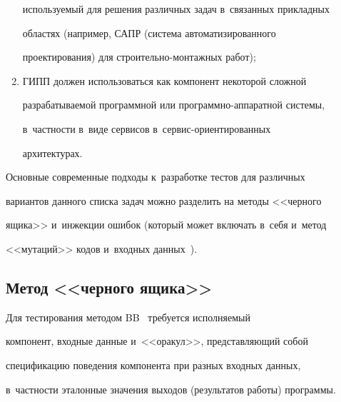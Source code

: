 \begin{multicols}{2}
\begin{enumerate}[(1)]
используемый для решения различных задач в~связанных прикладных 


областях (например, САПР (система автоматизированного


проектирования) для стро\-и\-тель\-но-мон\-таж\-ных работ);


    \item ГИПП должен использоваться как компонент некоторой сложной 


разрабатываемой программной или программно-аппаратной системы, 


в~частности в~виде сервисов в~сер\-вис-ори\-ен\-ти\-ро\-ван\-ных 


архитектурах.


    \end{enumerate}


    


    Основные современные подходы к~разработке тестов для различных 


вариантов данного списка задач можно разделить на методы <<черного 


ящика>>  и~инжекции ошибок (который может включать в~себя и~метод 


<<мутаций>> кодов и~входных данных~\cite{8-bf}).





\vspace*{-3pt}


    


    \subsection{Метод <<черного ящика>>}


    


    \vspace*{-1pt}


    


    Для тестирования методом BB~\cite{9-bf} требуется исполняемый 


компонент, входные данные и~<<оракул>>, представляющий собой 


спецификацию поведения компонента при разных входных данных, 


в~частности эталонные значения выходов (результатов работы) программы.


    



\end{multicols}
